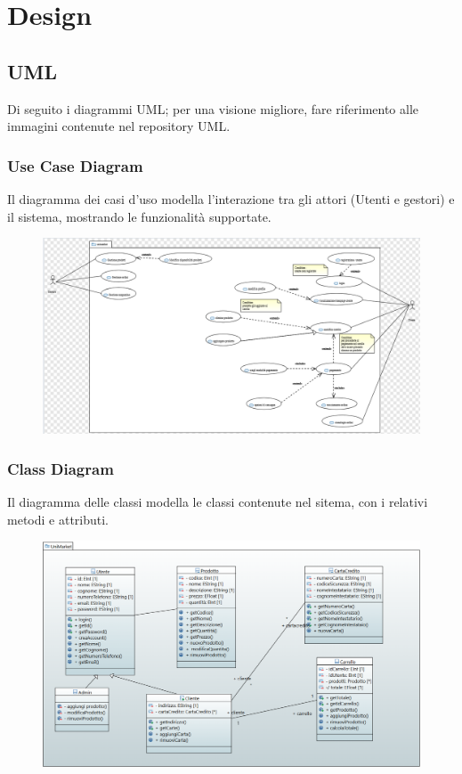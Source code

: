 \documentclass[a4paper,12pt]{article}
\begin{document}
\section{Design}
\subsection{UML}
Di seguito i diagrammi UML; per una visione migliore, fare riferimento alle immagini contenute nel repository UML.
\subsubsection{Use Case Diagram}
Il diagramma dei casi d'uso modella l'interazione tra gli attori (Utenti e gestori) e il sistema, mostrando le funzionalità supportate.
\begin{figure}[H]
    \centering
    \includegraphics[width=1\textwidth]{../UML/UML png/UseCaseDiagram.png}
    \label{fig:Use Case Diagram}
\end{figure}
\subsubsection{Class Diagram}
Il diagramma delle classi modella le classi contenute nel sitema, con i relativi metodi e attributi.
\begin{figure}[H]
    \centering
    \includegraphics[width=1\textwidth]{../UML/UML png/ClassDiagram.png}
    \label{fig:Class Diagram}
\end{figure}
\end{document}

